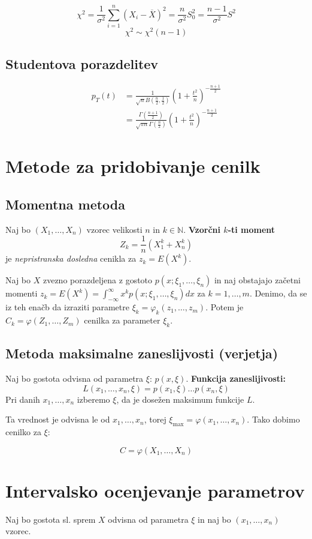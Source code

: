 \begin{multicols}{5}
\[ \chi^2 = \frac{1}{\sigma^2} \sum_{i=1}^{n} (X_i - \overline{X})^2 = \frac{n}{\sigma^2}S_0^2 = \frac{n-1}{\sigma^2}S^2\]
\[ \chi^2 \sim \chi^2(n-1)\]

\subsection{Studentova porazdelitev}
\begin{align*}
    p_T(t) &= \frac{1}{\sqrt{n} B(\frac{n}{2}, \frac{1}{2} )} \left(1 + \frac{t^2}{n}\right)^{-\frac{n+1}{2}} \\
    &= \frac{\Gamma(\frac{n+1}{2})}{\sqrt{\pi n} \Gamma(\frac{n}{2})} \left(1 + \frac{t^2}{n}\right)^{-\frac{n+1}{2}}
\end{align*}

\section{Metode za pridobivanje cenilk}
\subsection{Momentna metoda}
Naj bo $(X_1, \dots, X_n)$ vzorec velikosti $n$ in $k \in \mathbb{N}$.
\textbf{Vzorčni $k$-ti moment}
\[ Z_k = \frac{1}{n}\left( X_1^k + X_n^k \right)\]
je \textit{nepristranska dosledna} cenikla za $z_k = E(X^k)$.

Naj bo $X$ zvezno porazdeljena z gostoto $p(x; \xi_1, \dots, \xi_n)$ in naj obstajajo začetni momenti 
$z_k = E(X^k) = \int_{-\infty}^{\infty} x^k p(x; \xi_1, \dots, \xi_n) dx$ za $k = 1, \dots, m$. Denimo, da se
iz teh enačb da izraziti parametre $\xi_k = \varphi_k(z_1, \dots, z_m)$. Potem je $C_k = \varphi(Z_1, \dots, Z_m)$ cenilka za parameter $\xi_k$.

\subsection{Metoda maksimalne zaneslijvosti (verjetja)}
Naj bo gostota odvisna od parametra $\xi$: $p(x, \xi)$.
\textbf{Funkcija zaneslijivosti:}
\[L(x_1, \dots, x_n, \xi) = p(x_1, \xi) \dots p(x_n, \xi)\]
Pri danih $x_1, \dots, x_n$ izberemo $\xi$, da je dosežen maksimum funkcije $L$.

Ta vrednost je odvisna le od $x_1, \dots, x_n$, torej $\xi_{\max} = \varphi(x_1, \dots, x_n)$. Tako dobimo cenilko za $\xi$:

\[ C = \varphi(X_1, \dots, X_n)\]

\section{Intervalsko ocenjevanje parametrov}
Naj bo gostota sl. sprem $X$ odvisna od parametra $\xi$ in naj bo $(x_1, \dots, x_n)$ vzorec.


\end{multicols}
